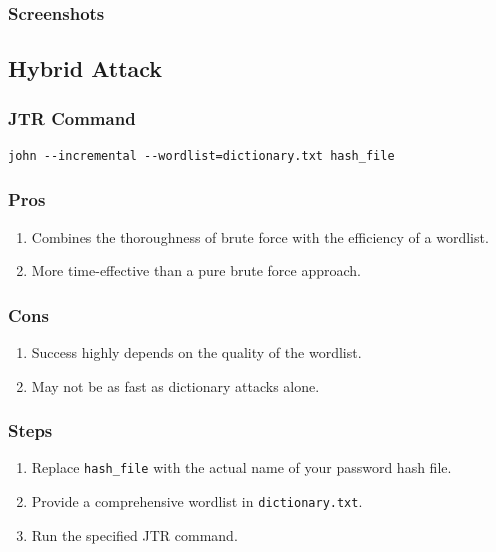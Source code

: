 \documentclass[11pt]{article}
\begin{document}
\subsubsection{Screenshots}

\subsection{Hybrid Attack}

\subsubsection{JTR Command}

\begin{verbatim}
john --incremental --wordlist=dictionary.txt hash_file
\end{verbatim}

\subsubsection{Pros}

\begin{enumerate}
    \item Combines the thoroughness of brute force with the efficiency of a wordlist.
    \item More time-effective than a pure brute force approach.
\end{enumerate}

\subsubsection{Cons}

\begin{enumerate}
    \item Success highly depends on the quality of the wordlist.
    \item May not be as fast as dictionary attacks alone.
\end{enumerate}

\subsubsection{Steps}

\begin{enumerate}
    \item Replace \texttt{hash\_file} with the actual name of your password hash file.
    \item Provide a comprehensive wordlist in \texttt{dictionary.txt}.
    \item Run the specified JTR command.
\end{enumerate}
\end{document}
